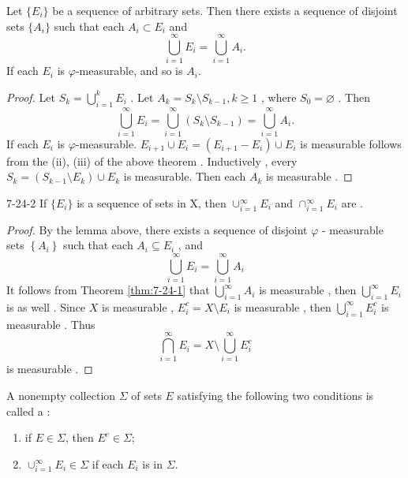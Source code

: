 \documentclass[../main.tex]{subfiles}
\begin{document}
\begin{lemma}{}{}
Let $\{E_i\}$ be a sequence of arbitrary sets. Then there exists a sequence of disjoint sets $\{A_i\}$ such that each $A_i \subset E_i$ and
\[
\bigcup_{i=1}^{\infty} E_i = \bigcup_{i=1}^{\infty} A_i.
\]
If each $E_i$ is $\varphi$-measurable, and so is $A_i$.
\end{lemma}
\begin{proof}
    Let \(  S_{k}= \bigcup _{i= 1}^{k}E_{i}  \) .  Let  \(  A_{k}= S_{k}\setminus S_{k-1} ,k \ge 1  \) , where \(  S_0   = \varnothing\) .  Then \[
    \bigcup _{i = 1}^{\infty}E_{i}= \bigcup _{i = 1}^{\infty}\left( S_{k}\setminus S_{k-1} \right)  = \bigcup _{i = 1}^{\infty}A_{i} .
    \]  If each \(  E_{i}  \) is \(   \varphi   \)-measurable.   \(  E_{i+ 1}\cup E_{i}= \left( E_{i+ 1}-E_{i} \right)\cup E_{i}    \) is measurable follows from the (ii), (iii) of the above theorem . Inductively , every \(  S_{k}=  \left( S_{k-1}\setminus E_{k} \right)\cup E_{k}   \)  is measurable.  Then  each \(  A_{k}   \) is measurable .  
\end{proof}

\begin{theorem}{}{7-24-2}
If $\{E_i\}$ is a sequence of  sets in X, then $\cup_{i=1}^{\infty} E_i$ and $\cap_{i=1}^{\infty} E_i$ are .
\end{theorem}

\begin{proof}
    By the lemma above, there exists a sequence of disjoint \(   \varphi   \) - measurable sets \(  \left\{ A_{i} \right\}  \) such that each \(  A_{i}\subseteq E_{i}  \) , and \[
    \bigcup _{i = 1}^{\infty}E_{i}= \bigcup _{i = 1}^{\infty}A_{i}
    \]  It follows from Theorem \ref{thm:7-24-1} that \(  \bigcup _{i = 1}^{\infty}A_{i}  \) is measurable , then \(  \bigcup _{i = 1}^{\infty}E_{i}  \) is as well .   Since \(  X   \) is measurable , \(  E_{i}^{c}= X\setminus E_{i}  \) is measurable , then   \(  \bigcup _{i = 1}^{\infty}E_{i}^{c}  \) is measurable .  Thus \[
    \bigcap_{i= 1}^{\infty}E_{i}=  X\setminus \bigcup _{i= 1}^{\infty}E_{i}^{c} 
    \] is measurable . 
\end{proof}

\begin{definition}{}{}
A nonempty collection $\Sigma$ of sets $E$ satisfying the following two conditions is called a :
\begin{enumerate}
    \item[(i)] if $E \in \Sigma$, then $E^{c} \in \Sigma$;
    \item[(ii)] $\cup_{i=1}^{\infty} E_i \in \Sigma$ if each $E_i$ is in $\Sigma$.
\end{enumerate}
\end{definition}
\end{document}
